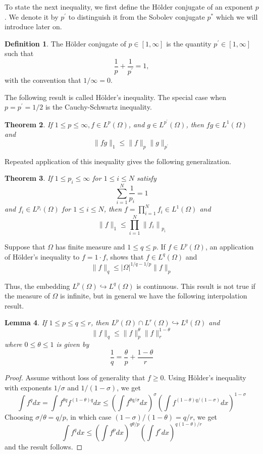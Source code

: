 \documentclass[10pt]{article}
\theoremstyle{plain}
\newtheorem{theorem}{Theorem}[section]
\newtheorem{lemma}[theorem]{Lemma}
\theoremstyle{definition}
\newtheorem{definition}[theorem]{Definition}
\theoremstyle{remark}
\begin{document}
To state the next inequality, we first define the Hölder conjugate of an exponent $p$. We denote it by $p^{\prime}$ to distinguish it from the Sobolev conjugate $p^{*}$ which we will introduce later on.

\begin{definition}
The Hölder conjugate of $p \in[1, \infty]$ is the quantity $p^{\prime} \in[1, \infty]$ such that
$$
\frac{1}{p}+\frac{1}{p^{\prime}}=1,
$$
with the convention that $1 / \infty=0$.
\end{definition}

The following result is called Hölder's inequality. The special case when $p=p^{\prime}=1/2$ is the Cauchy-Schwartz inequality.

\begin{theorem}
If $1 \leq p \leq \infty, f \in L^{p}(\Omega)$, and $g \in L^{p^{\prime}}(\Omega)$, then $f g \in L^{1}(\Omega)$ and
$$
\|f g\|_{1} \leq\|f\|_{p}\|g\|_{p^{\prime}}
$$
\end{theorem}

Repeated application of this inequality gives the following generalization.

\begin{theorem}
If $1 \leq p_{i} \leq \infty$ for $1 \leq i \leq N$ satisfy
$$
\sum_{i=1}^{N} \frac{1}{p_{i}}=1
$$
and $f_{i} \in L^{p_{i}}(\Omega)$ for $1 \leq i \leq N$, then $f=\prod_{i=1}^{N} f_{i} \in L^{1}(\Omega)$ and
$$
\|f\|_{1} \leq \prod_{i=1}^{N}\left\|f_{i}\right\|_{p_{i}}
$$
\end{theorem}

Suppose that $\Omega$ has finite measure and $1 \leq q \leq p$. If $f \in L^{p}(\Omega)$, an application of Hölder's inequality to $f=1 \cdot f$, shows that $f \in L^{q}(\Omega)$ and
$$
\|f\|_{q} \leq|\Omega|^{1/q-1/p}\|f\|_{p}
$$

Thus, the embedding $L^{p}(\Omega) \hookrightarrow L^{q}(\Omega)$ is continuous. This result is not true if the measure of $\Omega$ is infinite, but in general we have the following interpolation result.

\begin{lemma}
If $1 \leq p \leq q \leq r$, then $L^{p}(\Omega) \cap L^{r}(\Omega) \hookrightarrow L^{q}(\Omega)$ and
$$
\|f\|_{q} \leq\|f\|_{p}^{\theta}\|f\|_{r}^{1-\theta}
$$
where $0 \leq \theta \leq 1$ is given by
$$
\frac{1}{q}=\frac{\theta}{p}+\frac{1-\theta}{r}
$$
\end{lemma}

\begin{proof}
Assume without loss of generality that $f \geq 0$. Using Hölder's inequality with exponents $1 / \sigma$ and $1 /(1-\sigma)$, we get
$$
\int f^{q} dx=\int f^{\theta q} f^{(1-\theta) q} dx \leq\left(\int f^{\theta q / \sigma} dx\right)^{\sigma}\left(\int f^{(1-\theta) q /(1-\sigma)} dx\right)^{1-\sigma}
$$
Choosing $\sigma / \theta=q / p$, in which case $(1-\sigma) /(1-\theta)=q / r$, we get
$$
\int f^{q} dx \leq\left(\int f^{p} dx\right)^{q \theta / p}\left(\int f^{r} dx\right)^{q(1-\theta) / r}
$$
and the result follows.
\end{proof}
\end{document}
